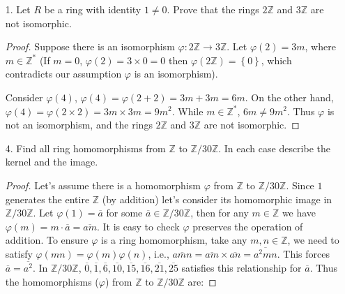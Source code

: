 \documentclass[10pt]{article}
\newcommand{\Z}{\mathbb{Z}}
\begin{document}
\begin{itemize}

\item[1.] Let $R$ be a ring with identity $1 \neq 0$. Prove that the rings $2\Z$ and $3\Z$ are not isomorphic.

\begin{proof} Suppose there is an isomorphism $\varphi: 2\Z \rightarrow 3\Z$. Let $\varphi(2) = 3m$, where $m \in \Z^*$ (If $m = 0$, $\varphi(2) = 3 \times 0 = 0$ then $\varphi(2\Z) = \left\{0\right\}$, which contradicts our assumption $\varphi$ is an isomorphism).

Consider $\varphi(4)$, $\varphi(4) = \varphi(2+2) = 3m + 3m = 6m$. 
On the other hand, $\varphi(4) = \varphi(2 \times 2) = 3m \times 3m = 9m^2$.  While $m \in \Z^*$, $6m \neq 9m^2$. Thus $\varphi$ is not an isomorphism, and the rings $2\Z$ and $3\Z$ are not isomorphic.
\end{proof}

\item[4.] Find all ring homomorphisms from $\Z$ to $\Z/30\Z$. In each case describe the kernel and the image.

\begin{proof} Let's assume there is a homomorphism $\varphi$ from $\Z$ to $\Z/30\Z$.  Since $1$ generates the entire $\Z$ (by addition) let's consider its homomorphic image in $\Z/30\Z$. Let $\varphi(1) = \overline{a}$ for some $\overline{a} \in \Z/30\Z$, then for any $m \in \Z$ we have $\varphi(m) = m \cdot \overline{a} = \overline{am}$. It is easy to check $\varphi$ preserves the operation of addition. To ensure $\varphi$ is a ring homomorphism, take any $m, n \in \Z$, we need to satisfy $\varphi(mn) = \varphi(m)\varphi(n)$, i.e., $\overline{amn} = \overline{am}\times \overline{an} = \overline{a^2mn}$.  This forces $\overline{a} = \overline{a^2}$. In $\Z/30\Z$,  $\overline{0}, \overline{1}, \overline{6}, \overline{10}, \overline{15}, \overline{16}, \overline{21}, \overline{25}$ satisfies this relationship for $\overline{a}$. Thus the homomorphisms ($\varphi$) from $\Z$ to $\Z/30\Z$ are:
  

\end{proof}
\end{itemize}
\end{document}
